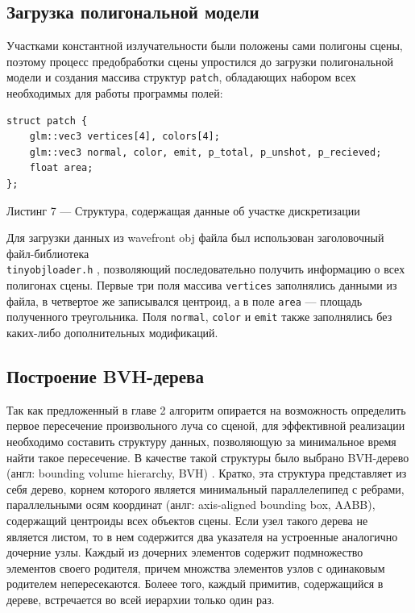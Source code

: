 \documentclass[12pt]{article}
\begin{document}
\subsection{Загрузка полигональной модели}
Участками константной излучательности были положены сами полигоны сцены, поэтому процесс предобработки сцены упростился до загрузки полигональной модели и создания массива структур \texttt{patch}, обладающих набором всех необходимых для работы программы полей:
\begin{lstlisting}
struct patch {
    glm::vec3 vertices[4], colors[4];
    glm::vec3 normal, color, emit, p_total, p_unshot, p_recieved;
    float area;
};
\end{lstlisting}
\begin{center}Листинг 7 --- Структура, содержащая данные об участке дискретизации \end{center}

Для загрузки данных из wavefront obj файла был использован заголовочный файл-библиотека\\ \texttt{tinyobjloader.h} \cite{Fuj12}, позволяющий последовательно получить информацию о всех полигонах сцены. Первые три поля массива \texttt{vertices} заполнялись данными из файла, в четвертое же записывался центроид, а в поле \texttt{area} --- площадь полученного треугольника. Поля \texttt{normal}, \texttt{color} и \texttt{emit} также заполнялись без каких-либо дополнительных модификаций.
\subsection{Построение BVH-дерева}
Так как предложенный в главе 2 алгоритм опирается на возможность определить первое пересечение произвольного луча со сценой, для эффективной реализации необходимо составить структуру данных, позволяющую за минимальное время найти такое пересечение. В качестве такой структуры было выбрано BVH-дерево (англ: bounding volume hierarchy, BVH) \cite{KK86}. Кратко, эта структура представляет из себя дерево, корнем которого является минимальный параллелепипед с ребрами, параллельными осям координат (анлг: axis-aligned bounding box, AABB), содержащий центроиды всех объектов сцены. Если узел такого дерева не является листом, то в нем содержится два указателя на устроенные аналогично дочерние узлы. Каждый из дочерних элементов содержит подмножество элементов своего родителя, причем множства элементов узлов с одинаковым родителем непересекаются.  Болеее того, каждый примитив, содержащийся в дереве, встречается во всей иерархии только один раз. 
\end{document}
